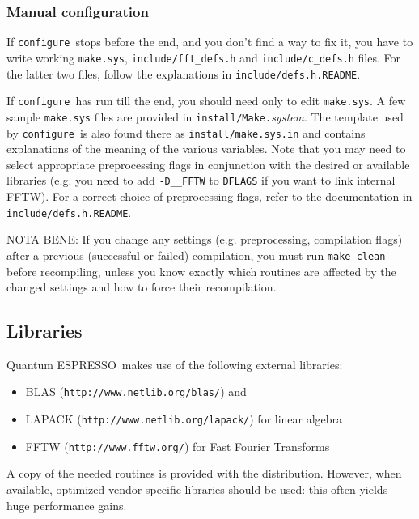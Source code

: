 \documentclass[12pt,a4paper]{article}
\def\qe{{\sc Quantum ESPRESSO}}
\def\configure{\texttt{configure}}
\begin{document}
\subsubsection{Manual configuration}
\label{SubSec:manconf}
If \configure\ stops before the end, and you don't find a way to fix
it, you have to write working \texttt{make.sys}, \texttt{include/fft\_defs.h}
and \texttt{include/c\_defs.h} files. 
For the latter two files, follow the explanations in 
\texttt{include/defs.h.README}.

If \configure\ has run till the end, you should need only to
edit \texttt{make.sys}. A few sample \texttt{make.sys} files
are provided in \texttt{install/Make.}{\em system}. The template used 
by \configure\ is also found there as \texttt{install/make.sys.in} 
and contains explanations of the meaning
of the various variables. Note that you may need 
to select appropriate preprocessing flags
in conjunction with the desired or available
libraries (e.g. you need to add \texttt{-D\_\_FFTW} to \texttt{DFLAGS}
if you want to link internal FFTW). For a correct choice of preprocessing 
flags, refer to the documentation in \texttt{include/defs.h.README}.

NOTA BENE: If you change any settings (e.g. preprocessing,
compilation flags) 
after a previous (successful or failed) compilation, you must run 
\texttt{make clean} before recompiling, unless you know exactly which 
routines are affected by the changed settings and how to force their recompilation.

\subsection{Libraries}
\label{Sec:Libraries}

\qe\ makes use of the following external libraries:
\begin{itemize}
\item BLAS (\texttt{http://www.netlib.org/blas/}) and 
\item LAPACK (\texttt{http://www.netlib.org/lapack/}) for linear algebra 
\item FFTW (\texttt{http://www.fftw.org/}) for Fast Fourier Transforms
\end{itemize}
A copy of the needed routines is provided with the distribution. However,
when available, optimized vendor-specific libraries should be used: this
often yields huge performance gains.
\end{document}
